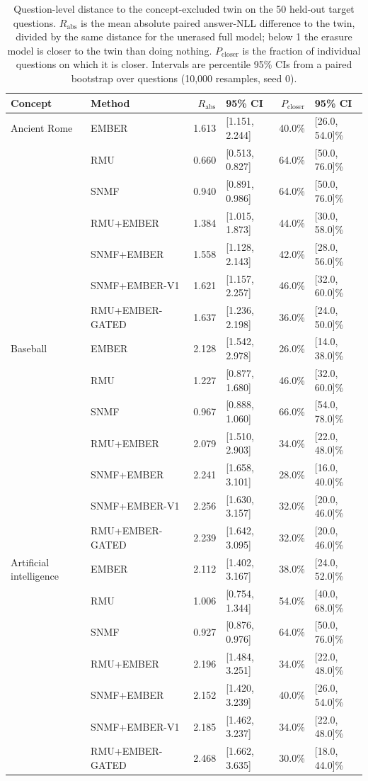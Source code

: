 
\begin{table}[t]
\centering
\small
\begin{tabular}{llrlrl}
\toprule
Concept & Method & $R_{\mathrm{abs}}$ & 95\% CI & $P_{\mathrm{closer}}$ & 95\% CI \\
\midrule
Ancient Rome & EMBER & 1.613 & [1.151, 2.244] & 40.0\% & [26.0, 54.0]\% \\
 & RMU & 0.660 & [0.513, 0.827] & 64.0\% & [50.0, 76.0]\% \\
 & SNMF & 0.940 & [0.891, 0.986] & 64.0\% & [50.0, 76.0]\% \\
 & RMU+EMBER & 1.384 & [1.015, 1.873] & 44.0\% & [30.0, 58.0]\% \\
 & SNMF+EMBER & 1.558 & [1.128, 2.143] & 42.0\% & [28.0, 56.0]\% \\
 & SNMF+EMBER-V1 & 1.621 & [1.157, 2.257] & 46.0\% & [32.0, 60.0]\% \\
 & RMU+EMBER-GATED & 1.637 & [1.236, 2.198] & 36.0\% & [24.0, 50.0]\% \\
\midrule
Baseball & EMBER & 2.128 & [1.542, 2.978] & 26.0\% & [14.0, 38.0]\% \\
 & RMU & 1.227 & [0.877, 1.680] & 46.0\% & [32.0, 60.0]\% \\
 & SNMF & 0.967 & [0.888, 1.060] & 66.0\% & [54.0, 78.0]\% \\
 & RMU+EMBER & 2.079 & [1.510, 2.903] & 34.0\% & [22.0, 48.0]\% \\
 & SNMF+EMBER & 2.241 & [1.658, 3.101] & 28.0\% & [16.0, 40.0]\% \\
 & SNMF+EMBER-V1 & 2.256 & [1.630, 3.157] & 32.0\% & [20.0, 46.0]\% \\
 & RMU+EMBER-GATED & 2.239 & [1.642, 3.095] & 32.0\% & [20.0, 46.0]\% \\
\midrule
Artificial intelligence & EMBER & 2.112 & [1.402, 3.167] & 38.0\% & [24.0, 52.0]\% \\
 & RMU & 1.006 & [0.754, 1.344] & 54.0\% & [40.0, 68.0]\% \\
 & SNMF & 0.927 & [0.876, 0.976] & 64.0\% & [50.0, 76.0]\% \\
 & RMU+EMBER & 2.196 & [1.484, 3.251] & 34.0\% & [22.0, 48.0]\% \\
 & SNMF+EMBER & 2.152 & [1.420, 3.239] & 40.0\% & [26.0, 54.0]\% \\
 & SNMF+EMBER-V1 & 2.185 & [1.462, 3.237] & 34.0\% & [22.0, 48.0]\% \\
 & RMU+EMBER-GATED & 2.468 & [1.662, 3.635] & 30.0\% & [18.0, 44.0]\% \\
\bottomrule
\end{tabular}
\caption{Question-level distance to the concept-excluded twin on the 50 held-out target questions. $R_{\mathrm{abs}}$ is the mean absolute paired answer-NLL difference to the twin, divided by the same distance for the unerased full model; below 1 the erasure model is closer to the twin than doing nothing. $P_{\mathrm{closer}}$ is the fraction of individual questions on which it is closer. Intervals are percentile 95\% CIs from a paired bootstrap over questions (10{,}000 resamples, seed 0).}
\label{tab:question-level-similarity}
\end{table}
